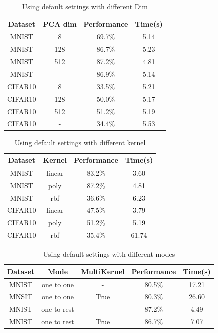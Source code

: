 \documentclass[conference]{IEEEtran}
\begin{document}
	\begin{table}[!h]
		\centering
		\caption{Using default settings with different Dim}
		\begin{tabular}{cccc}
			\toprule
			Dataset & PCA dim & Performance & Time(s) \\
			\midrule
			MNIST & 8 & 69.7\% & 5.14 \\
			MNIST & 128 & 86.7\% & 5.23 \\
			MNIST & 512 & 87.2\% & 4.81 \\
			MNIST & - & 86.9\% & 5.14 \\
			CIFAR10 & 8 & 33.5\% & 5.21 \\
			CIFAR10 & 128 & 50.0\% & 5.17 \\
			CIFAR10 & 512 & 51.2\% & 5.19 \\
			CIFAR10 & - & 34.4\% & 5.53 \\
			\bottomrule
		\end{tabular}
		\label{t4}
	\end{table}
	
	\begin{table}[!h]
		\centering
		\caption{Using default settings with different kernel}
		\begin{tabular}{cccc}
			\toprule
			Dataset & Kernel & Performance & Time(s) \\
			\midrule
			MNIST & linear & 83.2\% & 3.60 \\
			MNIST & poly & 87.2\% & 4.81 \\
			MNIST & rbf & 36.6\% & 6.23 \\
			CIFAR10 & linear & 47.5\% & 3.79 \\
			CIFAR10 & poly & 51.2\% & 5.19 \\
			CIFAR10 & rbf & 35.4\% & 61.74 \\
			\bottomrule
		\end{tabular}
		\label{t5}
	\end{table}
	
	\begin{table}[!h]
		\centering
		\caption{Using default settings with different modes}
		\begin{tabular}{ccccc}
			\toprule
			Dataset & Mode & MultiKernel & Performance & Time(s) \\
			\midrule
			MNIST & one to one & - & 80.5\% & 17.21 \\
			MNSIT & one to one & True & 80.3\% & 26.60 \\
			MNIST & one to rest & - & 87.2\% & 4.49 \\
			MNIST & one to rest & True & 86.7\% & 7.07 \\
			\bottomrule
		\end{tabular}
		\label{t6}
	\end{table}
	
\end{document}
